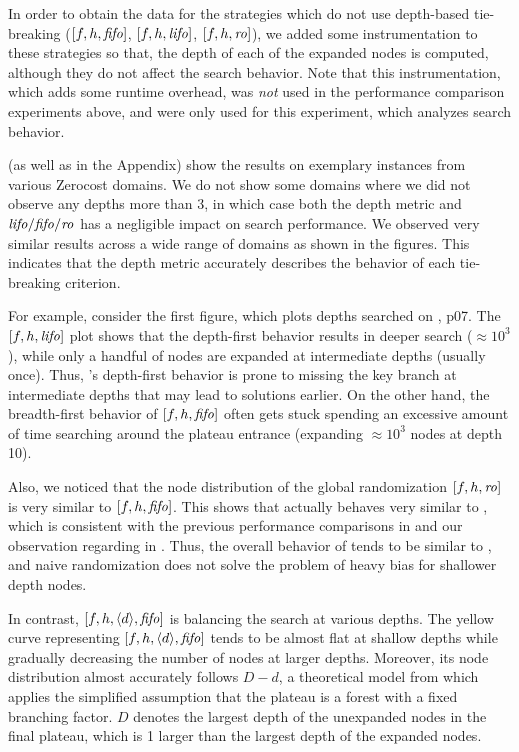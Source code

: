 In order to obtain the data for the strategies which do not use depth-based tie-breaking ($[f,h,{\text{\textit{fifo}}}]$, $[f,h,{\text{\textit{lifo}}}]$, $[f,h,{\text{\textit{ro}}}]$), we added some instrumentation to these strategies so that, the depth of each of the expanded nodes is computed, although they do not affect the search behavior.
Note that this instrumentation, which adds some runtime overhead, was \emph{not}
used in the performance comparison experiments above, and were only used for this experiment, which analyzes search behavior.


 (as well as  in the Appendix) show the results on exemplary instances from 
various Zerocost domains.  We do not show some domains where we did not observe any depths more than 3, in which case both
the depth metric and  ${\text{\textit{lifo}}}/{\text{\textit{fifo}}}/{\text{\textit{ro}}}$ has a negligible impact on search performance.
We observed very similar results across a wide range of domains as shown in the figures.
This indicates that the depth metric accurately describes the behavior of each tie-breaking criterion.

For example, consider the first figure, which plots depths searched on , p07.
% 
The  $[f,h,{\text{\textit{lifo}}}]$ plot shows that the depth-first behavior results in deeper search ($\approx 10^3$), while
only a handful of nodes are expanded at intermediate depths (usually once). Thus,  \lifo's depth-first
behavior is prone to  missing the key branch at intermediate depths that may lead to solutions earlier.
On the other hand, the breadth-first behavior of $[f,h,{\text{\textit{fifo}}}]$ often gets stuck spending an excessive amount of
time searching around the plateau entrance (expanding $\approx 10^3$ nodes at depth 10).

Also, we noticed that the node distribution of the global randomization $[f,h,{\text{\textit{ro}}}]$ is very similar to $[f,h,{\text{\textit{fifo}}}]$.
This shows that \ro actually behaves very similar to \fifo, which is consistent with the previous performance comparisons in  and our observation regarding \ro in .
Thus, the overall behavior of \ro tends to be similar to \fifo, and naive randomization does not solve the problem of heavy bias for shallower depth nodes.

In contrast, $[f,h,{\left<d\right>},{\text{\textit{fifo}}}]$ is balancing the search at various depths.
The yellow curve representing $[f,h,{\left<d\right>},{\text{\textit{fifo}}}]$ tends to be almost flat at shallow depths while gradually decreasing the number of nodes at larger depths.
Moreover, its node distribution almost accurately follows $D-d$, a theoretical model from  which applies the simplified
assumption that the plateau is a forest with a fixed branching factor.
$D$ denotes the largest depth of the unexpanded nodes in the final plateau, which is
1 larger than the largest depth of the expanded nodes.

